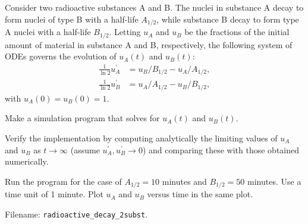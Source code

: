 \documentclass[graybox,sectrefs,envcountresetchap,open=right,final]{svmonodo}
\makeatletter
\newenvironment{doconceexercise}{}{}
\newcounter{doconceexercisecounter}%
\newcommand\listofexercises{
\chapter*{List of Exercises, Problems, and Projects
          \@mkboth{List of Exercises, Problems, and Projects}{List of Exercises, Problems, and Projects}}
\markboth{List of Exercises, Problems, and Projects}{List of Exercises, Problems, and Projects}
\@starttoc{loe}
}
\makeatother
\begin{document}
\begin{doconceexercise}

                
\label{decay:app:exer:radio:twosubst}

Consider two radioactive substances A and B. The nuclei in substance A
decay to form nuclei of type B with a half-life $A_{1/2}$, while
substance B decay to form type A nuclei with a half-life $B_{1/2}$.
Letting $u_A$ and $u_B$ be the fractions of the initial amount of
material in substance A and B, respectively, the following system of
ODEs governs the evolution of $u_A(t)$ and $u_B(t)$:
\begin{align}
\frac{1}{\ln 2} u_A^{\prime} &= u_B/B_{1/2} - u_A/A_{1/2},\\ 
\frac{1}{\ln 2} u_B^{\prime} &= u_A/A_{1/2} - u_B/B_{1/2},
\end{align}
with $u_A(0)=u_B(0)=1$.

Make a simulation program that solves for $u_A(t)$ and $u_B(t)$.


Verify the implementation by computing analytically
the limiting values of
$u_A$ and $u_B$ as $t\rightarrow \infty$ (assume $u_A^{\prime},u_B^{\prime}\rightarrow 0$)
and comparing these with those obtained numerically.


Run the program for the case of $A_{1/2}=10$ minutes and $B_{1/2}=50$ minutes.
Use a time unit of 1 minute. Plot $u_A$ and $u_B$ versus time in the same
plot.


\noindent Filename: \Verb!radioactive_decay_2subst!.

\end{doconceexercise}
\end{document}

